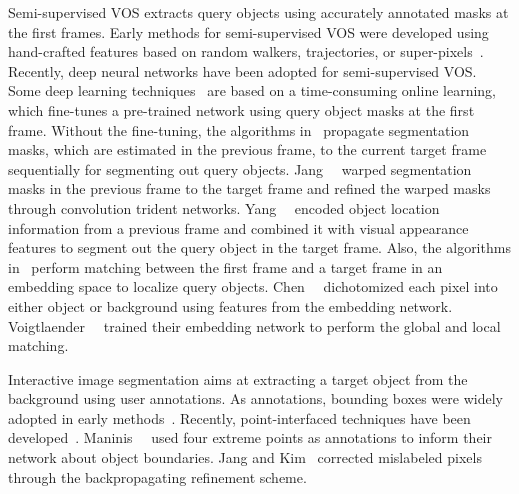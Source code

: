 \documentclass[runningheads]{llncs}
\begin{document}
Semi-supervised VOS extracts query objects using accurately annotated masks at the first frames. Early methods for semi-supervised VOS were developed using hand-crafted features based on random walkers, trajectories, or super-pixels~\cite{brox2010object, jain2014supervoxel, Jang2016BMVC}. Recently, deep neural networks have been adopted for semi-supervised VOS. Some deep learning techniques~\cite{caelles2017one, voigtlaender2017online, maninis2018video} are based on a time-consuming online learning, which fine-tunes a pre-trained network using query object masks at the first frame. Without the fine-tuning, the algorithms in~\cite{Jang2017CVPR, cheng2017segflow, perazzi2017learning, yang2018efficient, Oh2018CVPR} propagate segmentation masks, which are estimated in the previous frame, to the current target frame sequentially for segmenting out query objects. Jang~\etal~\cite{Jang2017CVPR} warped segmentation masks in the previous frame to the target frame and refined the warped masks through convolution trident networks. Yang~\etal~\cite{yang2018efficient} encoded object location information from a previous frame and combined it with visual appearance features to segment out the query object in the target frame. Also, the algorithms in~\cite{chen2018blazingly, hu2018videomatch, voigtlaender2019feelvos, Oh2019ICCV} perform matching between the first frame and a target frame in an embedding space to localize query objects. Chen~\etal~\cite{chen2018blazingly} dichotomized each pixel into either object or background using features from the embedding network. Voigtlaender~\etal~\cite{voigtlaender2019feelvos} trained their embedding network to perform the global and local matching.

Interactive image segmentation aims at extracting a target object from the background using user annotations. As annotations, bounding boxes were widely adopted in early methods~\cite{rother2004grabcut, lempitsky2009image, tang2013grabcut, wu2014milcut}. Recently, point-interfaced techniques have been developed~\cite{xu2016deep, ManinisCaelles2018deep, song2018seednet, jang2019interactive}. Maninis~\etal~\cite{ManinisCaelles2018deep} used four extreme points as annotations to inform their network about object boundaries. Jang and Kim~\cite{jang2019interactive} corrected mislabeled pixels through the backpropagating refinement scheme.
\end{document}
